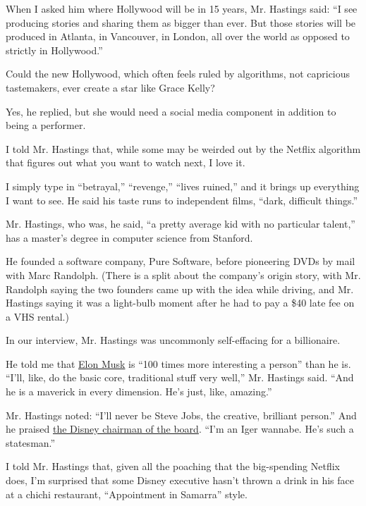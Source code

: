 When I asked him where Hollywood will be in 15 years, Mr. Hastings said:
``I see producing stories and sharing them as bigger than ever. But
those stories will be produced in Atlanta, in Vancouver, in London, all
over the world as opposed to strictly in Hollywood.''

Could the new Hollywood, which often feels ruled by algorithms, not
capricious tastemakers, ever create a star like Grace Kelly?

Yes, he replied, but she would need a social media component in addition
to being a performer.

I told Mr. Hastings that, while some may be weirded out by the Netflix
algorithm that figures out what you want to watch next, I love it.

I simply type in ``betrayal,'' ``revenge,'' ``lives ruined,'' and it
brings up everything I want to see. He said his taste runs to
independent films, ``dark, difficult things.''

Mr. Hastings, who was, he said, ``a pretty average kid with no
particular talent,'' has a master's degree in computer science from
Stanford.

He founded a software company, Pure Software, before pioneering DVDs by
mail with Marc Randolph. (There is a split about the company's origin
story, with Mr. Randolph saying the two founders came up with the idea
while driving, and Mr. Hastings saying it was a light-bulb moment after
he had to pay a \$40 late fee on a VHS rental.)

In our interview, Mr. Hastings was uncommonly self-effacing for a
billionaire.

He told me that
\href{https://www.nytimes3xbfgragh.onion/2020/07/25/style/elon-musk-maureen-dowd.html}{Elon
Musk} is ``100 times more interesting a person'' than he is. ``I'll,
like, do the basic core, traditional stuff very well,'' Mr. Hastings
said. ``And he is a maverick in every dimension. He's just, like,
amazing.''

Mr. Hastings noted: ``I'll never be Steve Jobs, the creative, brilliant
person.'' And he praised
\href{https://www.nytimes3xbfgragh.onion/2019/09/22/style/disney-bob-iger-book.html}{the
Disney chairman of the board}. ``I'm an Iger wannabe. He's such a
statesman.''

I told Mr. Hastings that, given all the poaching that the big-spending
Netflix does, I'm surprised that some Disney executive hasn't thrown a
drink in his face at a chichi restaurant, ``Appointment in Samarra''
style.

